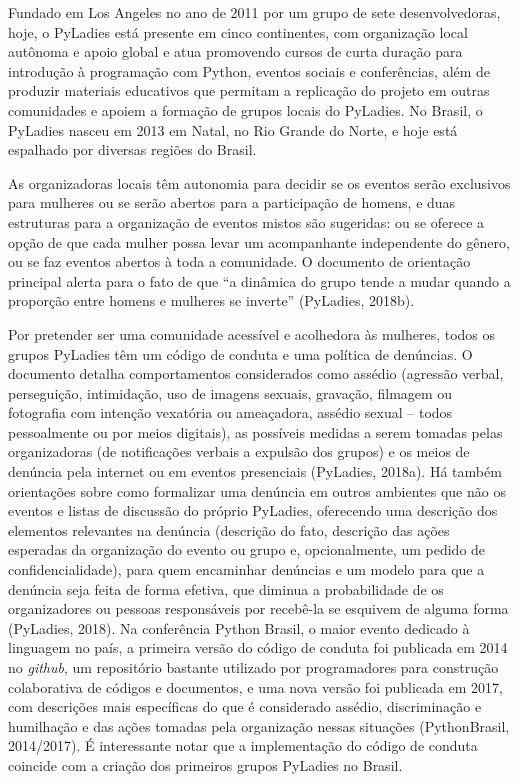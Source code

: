 Fundado em Los Angeles no ano de 2011 por um grupo de sete desenvolvedoras, hoje, o PyLadies está presente em cinco continentes, com organização local autônoma e apoio global e atua promovendo cursos de curta duração para introdução à programação com Python, eventos sociais e conferências, além de produzir materiais educativos que permitam a replicação do projeto em outras comunidades e apoiem a formação de grupos locais do PyLadies. No Brasil, o PyLadies nasceu em 2013 em Natal, no Rio Grande do Norte, e hoje está espalhado por diversas regiões do Brasil.

As organizadoras locais têm autonomia para decidir se os eventos serão exclusivos para mulheres ou se serão abertos para a participação de homens, e duas estruturas para a organização de eventos mistos são sugeridas: ou se oferece a opção de que cada mulher possa levar um acompanhante independente do gênero, ou se faz eventos abertos à toda a comunidade. O documento de orientação principal alerta para o fato de que “a dinâmica do grupo tende a mudar quando a proporção entre homens e mulheres se inverte” (PyLadies, 2018b).

Por pretender ser uma comunidade acessível e acolhedora às mulheres, todos os grupos PyLadies têm um código de conduta e uma política de denúncias. O documento detalha comportamentos considerados como assédio (agressão verbal, perseguição, intimidação, uso de imagens sexuais, gravação, filmagem ou fotografia com intenção vexatória ou ameaçadora, assédio sexual – todos pessoalmente ou por meios digitais), as possíveis medidas a serem tomadas pelas organizadoras (de notificações verbais a expulsão dos grupos) e os meios de denúncia pela internet ou em eventos presenciais (PyLadies, 2018a). Há também orientações sobre como formalizar uma denúncia em outros ambientes que não os eventos e listas de discussão do próprio PyLadies, oferecendo uma descrição dos elementos relevantes na denúncia (descrição do fato, descrição das ações esperadas da organização do evento ou grupo e, opcionalmente, um pedido de confidencialidade), para quem encaminhar denúncias e um modelo para que a denúncia seja feita de forma efetiva, que diminua a probabilidade de os organizadores ou pessoas responsáveis por recebê-la se esquivem de alguma forma (PyLadies, 2018). Na conferência Python Brasil, o maior evento dedicado à linguagem no país, a primeira versão do código de conduta foi publicada em 2014 no \textit{github}, um repositório bastante utilizado por programadores para construção colaborativa de códigos e documentos, e uma nova versão foi publicada em 2017, com descrições mais específicas do que é considerado assédio, discriminação e humilhação e das ações tomadas pela organização nessas situações (PythonBrasil, 2014/2017). É interessante notar que a implementação do código de conduta coincide com a criação dos primeiros grupos PyLadies no Brasil.

